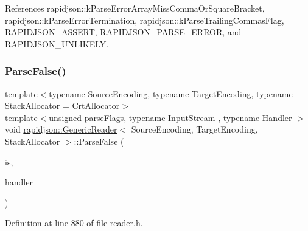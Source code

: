 References rapidjson\+::k\+Parse\+Error\+Array\+Miss\+Comma\+Or\+Square\+Bracket, rapidjson\+::k\+Parse\+Error\+Termination, rapidjson\+::k\+Parse\+Trailing\+Commas\+Flag, R\+A\+P\+I\+D\+J\+S\+O\+N\+\_\+\+A\+S\+S\+E\+RT, R\+A\+P\+I\+D\+J\+S\+O\+N\+\_\+\+P\+A\+R\+S\+E\+\_\+\+E\+R\+R\+OR, and R\+A\+P\+I\+D\+J\+S\+O\+N\+\_\+\+U\+N\+L\+I\+K\+E\+LY.

\mbox{\label{classrapidjson_1_1_generic_reader_a08ef26ce82243eeb9f8aae7e25b7ecdc}} 
\subsubsection{\texorpdfstring{ParseFalse()}{ParseFalse()}}
{\footnotesize\ttfamily template$<$typename Source\+Encoding, typename Target\+Encoding, typename Stack\+Allocator = Crt\+Allocator$>$ \\
template$<$unsigned parse\+Flags, typename Input\+Stream , typename Handler $>$ \\
void \mbox{\hyperlink{classrapidjson_1_1_generic_reader}{rapidjson\+::\+Generic\+Reader}}$<$ Source\+Encoding, Target\+Encoding, Stack\+Allocator $>$\+::Parse\+False (\begin{DoxyParamCaption}\item[{Input\+Stream \&}]{is,  }\item[{\mbox{\hyperlink{classrapidjson_1_1_handler}{Handler}} \&}]{handler }\end{DoxyParamCaption})\hspace{0.3cm}{\ttfamily [private]}}



Definition at line 880 of file reader.\+h.


